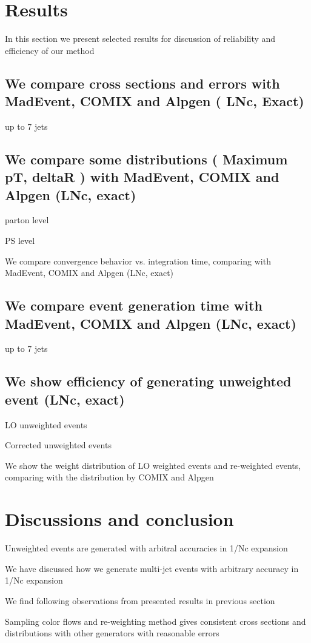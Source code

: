 \documentclass{book}
\begin{document}
\section{Results}
In this section we present selected results for discussion of reliability and efficiency of our method

\subsection{We compare cross sections and errors with MadEvent, COMIX and Alpgen ( LNc, Exact)}
up to 7 jets

\subsection{We compare some distributions ( Maximum pT, deltaR ) with MadEvent, COMIX and Alpgen (LNc, exact)}
parton level

PS level

We compare convergence behavior vs. integration time, comparing with MadEvent, COMIX and Alpgen (LNc, exact)

\subsection{We compare event generation time with MadEvent, COMIX and  Alpgen (LNc, exact)}
up to 7 jets

\subsection{We show efficiency of generating unweighted event (LNc, exact)}
LO unweighted events

Corrected unweighted events

We show the weight distribution of LO weighted events and re-weighted events, comparing with the distribution by COMIX and Alpgen

\section{Discussions and conclusion}
Unweighted events are generated with arbitral accuracies in 1/Nc expansion

We have discussed how we generate multi-jet events with arbitrary accuracy in 1/Nc expansion

We find following observations from presented results in previous section

Sampling color flows and re-weighting method gives consistent cross sections and distributions with other generators with reasonable errors
\end{document}
